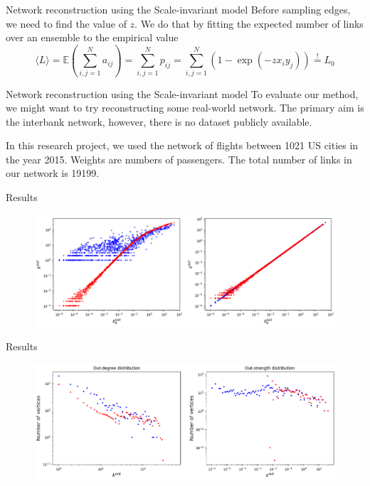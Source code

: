 \documentclass{beamer}
\begin{document}
\begin{frame}{Network reconstruction using the Scale-invariant model}
Before sampling edges, we need to find the value of $z$. We do that by fitting the expected number of links over an ensemble to the empirical value
\begin{equation*}
        \langle L \rangle = \mathbb{E}(\sum_{i,j=1}^{N} a_{ij}) = \sum_{i,j=1}^{N} p_{ij} = \sum_{i,j=1}^{N} (1 - \exp(-z x_i y_j)) \overset{!}{=} L_0
    \end{equation*}

\end{frame}

\begin{frame}{Network reconstruction using the Scale-invariant model}
To evaluate our method, we might want to try reconstructing some real-world network. The primary aim is the interbank network, however, there is no dataset publicly available. \\
\vspace{30px}

In this research project, we used the network of flights between 1021 US cities in the year 2015. Weights are numbers of passengers. The total number of links in our network is 19199.

\end{frame}

\begin{frame}{Results}
    \begin{figure}[!ht]
    \centering
    \includegraphics[scale=0.35]{img/Vanilla_SIM/deg_strengths_rec.png}
\end{figure}
\end{frame}

\begin{frame}{Results}
    \begin{figure}[!ht]
    \centering
    \includegraphics[scale=0.35]{img/Vanilla_SIM/deg_strengths_hist_rec.png}
\end{figure}
\end{frame}
\end{document}
